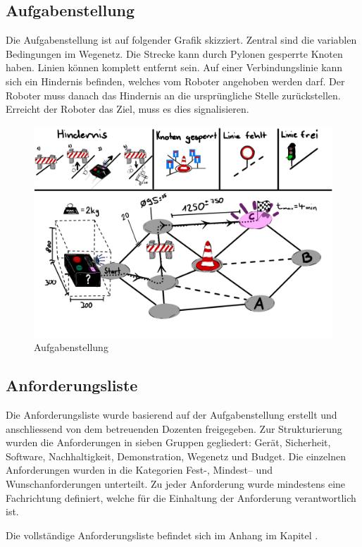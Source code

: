 \subsection{Aufgabenstellung}

Die Aufgabenstellung ist auf folgender Grafik skizziert. Zentral sind die variablen Bedingungen im Wegenetz. Die Strecke kann durch Pylonen gesperrte Knoten haben. Linien können komplett entfernt sein.  Auf einer Verbindungslinie kann sich ein Hindernis befinden, welches vom Roboter angehoben werden darf. Der Roboter muss danach das Hindernis an die ursprüngliche Stelle zurückstellen. Erreicht der Roboter das Ziel, muss es dies signalisieren.

\begin{figure}[H]
\centering
\includegraphics[width=\textwidth]{img/Skizze_Aufgabenstellung_v4.2.png}
\caption{Aufgabenstellung}
\label{fig:aufgebanstellung}
\end{figure}

\subsection{Anforderungsliste}

Die Anforderungsliste wurde basierend auf der Aufgabenstellung erstellt und anschliessend von dem betreuenden Dozenten freigegeben. Zur Strukturierung wurden die Anforderungen in sieben Gruppen gegliedert: Gerät, Sicherheit, Software, Nachhaltigkeit, Demonstration, Wegenetz und Budget. Die einzelnen Anforderungen wurden in die Kategorien Fest-, Mindest-- und Wunschanforderungen unterteilt. Zu jeder Anforderung wurde mindestens eine Fachrichtung definiert, welche für die Einhaltung der
Anforderung verantwortlich ist.

Die vollständige Anforderungsliste befindet sich im Anhang im Kapitel .